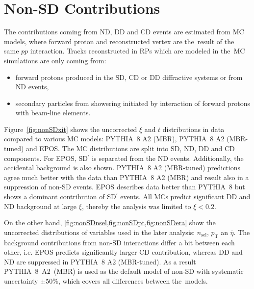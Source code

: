 \chapter{Non-SD Contributions}\label{section:star_nonSD}
The  contributions coming from \ac{ND}, \ac{DD} and \ac{CD} events are estimated from \ac{MC} models, where forward proton and reconstructed vertex are the~result of the same $pp$ interaction. Tracks reconstructed in \ac{RP}s  which are modeled in the~\ac{MC} simulations are only coming from:
\begin{itemize}
	\item forward protons produced in the \ac{SD}, \ac{CD} or \ac{DD} diffractive systems or from \ac{ND} events,
	\item secondary particles from showering initiated 
	by interaction of forward protons with beam-line elements.
\end{itemize}

Figure~\ref{fig:nonSDxit} shows the uncorrected $\xi$ and $t$ distributions in data compared to various \ac{MC} models: PYTHIA~8 A2 (MBR), PYTHIA~8 A2 (MBR-tuned) and EPOS. The \ac{MC} distributions are split into \ac{SD}, \ac{ND}, \ac{DD} and \ac{CD} components. For EPOS, SD$^\prime$ is separated from the ND events. Additionally, the accidental background is also shown. PYTHIA~8 A2 (MBR-tuned) predictions agree much better with the data than PYTHIA~8 A2 (MBR)  and result also in a suppression of non-SD events. EPOS describes data better than PYTHIA~8 but shows a dominant contribution of SD$^\prime$ events. All MCs predict significant \ac{DD} and \ac{ND} background at large $\xi$, thereby  the analysis was limited to $\xi < 0.2$. 

On the other hand, \cref{fig:nonSDnsel,fig:nonSDpt,fig:nonSDera} show the uncorrected distributions of variables used in the later analysis: $n_{\mathrm{sel}}$, $p_{\mathrm T}$ an $\bar{\eta}$. The background contributions from non-SD interactions differ a bit between each other, i.e. EPOS predicts significantly larger CD contribution, whereas DD and ND are suppressed in PYTHIA~8 A2 (MBR-tuned).  As a result PYTHIA~8~A2~(MBR) is used as the default model  of non-SD with systematic uncertainty $\pm50\%$, which covers all differences between the~models. %

